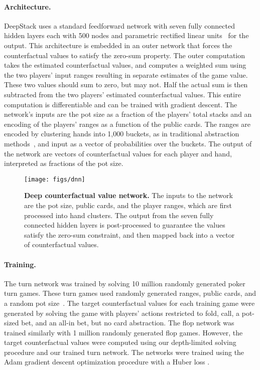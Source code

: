\documentclass[12pt]{article}
\newif\iffinal
\begin{document}
\paragraph*{Architecture.}  DeepStack uses a standard feedforward network with seven fully connected hidden layers each with 500 nodes and parametric rectified linear units~\cite{He15:PReLU} for the output.  This architecture is embedded in an outer network that forces the counterfactual values to satisfy the zero-sum property.  The outer computation takes the estimated counterfactual values, and computes a weighted sum using the two players' input ranges resulting in separate estimates of the game value.  These two values should sum to zero, but may not.  Half the actual sum is then subtracted from the two players' estimated counterfactual values.  
This entire computation is differentiable and can be trained with gradient descent.  The network's inputs are the pot size as a fraction of the players' total stacks and an encoding of the players' ranges as a function of the public cards.  The ranges are encoded by clustering hands into 1,000 buckets, as in traditional abstraction methods~\cite{Shi00:Rhode,Gilpin07:Abstraction,Johanson13:Abstraction}, and input as a vector of probabilities over the buckets.  
The output of the network are vectors of counterfactual values for each player and hand, interpreted as fractions of the pot size.

\iffinal\else 
\begin{figure}[t]
\centering
\texttt{[image: figs/dnn]}
\caption{{\bf Deep counterfactual value network.}  The inputs to the network are the pot size, public cards, and the player ranges, which are first processed into hand clusters.  The output from the seven fully connected hidden layers is post-processed to guarantee the values satisfy the zero-sum constraint, and then mapped back into a vector of counterfactual values. }\label{fig:dnn}
\end{figure}
\fi

\paragraph*{Training.}  The turn network was trained by solving 10 million randomly generated poker turn games.  These turn games used randomly generated ranges, public cards, and a random pot size~\cite{SOM}.  The target counterfactual values for each training game were generated by solving the game with players' actions restricted to fold, call, a pot-sized bet, and an all-in bet, but no card abstraction.  The flop network was trained similarly with 1 million randomly generated flop games.  However, the target counterfactual values were computed using our depth-limited solving procedure and our trained turn network.  The networks were trained using the Adam gradient descent optimization procedure\cite{kingma2014adam} with a Huber loss \cite{huber1964}. 
\end{document}
